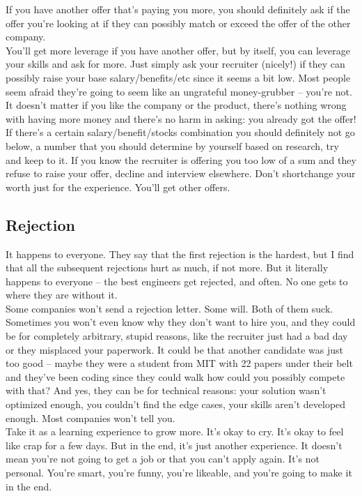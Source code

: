 \documentclass{article}
\begin{document}
If you have another offer that's paying you more, you should definitely ask if the offer you're looking at if they can possibly match or exceed the offer of the other company.\\

You'll get more leverage if you have another offer, but by itself, you can leverage your skills and ask for more. Just simply ask your recruiter (nicely!) if they can possibly raise your base salary/benefits/etc since it seems a bit low. Most people seem afraid they're going to seem like an ungrateful money-grubber -- you're not. It doesn't matter if you like the company or the product, there's nothing wrong with having more money and there's no harm in asking: you already got the offer! \\

If there's a certain salary/benefit/stocks combination you should definitely not go below, a number that you should determine by yourself based on research, try and keep to it. If you know the recruiter is offering you too low of a sum and they refuse to raise your offer, decline and interview elsewhere. Don't shortchange your worth just for the experience. You'll get other offers.
\subsection {Rejection}
\hspace{0.5cm} It happens to everyone. They say that the first rejection is the hardest, but I find that all the subsequent rejections hurt as much, if not more. But it literally happens to everyone -- the best engineers get rejected, and often. No one gets to where they are without it. \\

Some companies won't send a rejection letter. Some will. Both of them suck. Sometimes you won't even know why they don't want to hire you, and they could be for completely arbitrary, stupid reasons, like the recruiter just had a bad day or they misplaced your paperwork. It could be that another candidate was just too good -- maybe they were a student from MIT with 22 papers under their belt and they've been coding since they could walk how could you possibly compete with that? And yes, they can be for technical reasons: your solution wasn't optimized enough, you couldn't find the edge cases, your skills aren't developed enough. Most companies won't tell you.\\

Take it as a learning experience to grow more. It's okay to cry. It's okay to feel like crap for a few days. But in the end, it's just another experience. It doesn't mean you're not going to get a job or that you can't apply again. It's not personal. You're smart, you're funny, you're likeable, and you're going to make it in the end.
\end{document}
